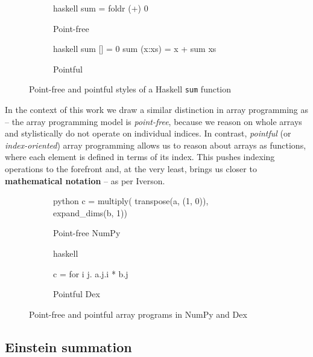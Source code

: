 \begin{figure}[h]
\centering
\begin{subfigure}{.3\textwidth}
  \centering
    \begin{cminted}{haskell}
sum = foldr (+) 0
    \end{cminted}
      \caption{Point-free}
\end{subfigure}%
\begin{subfigure}{.3\textwidth}
  \centering
  \begin{cminted}{haskell}
sum [] = 0
sum (x:xs) = x + sum xs
  \end{cminted}
  \caption{Pointful}
\end{subfigure}
\caption{Point-free and pointful styles of a Haskell \texttt{sum} function}
\label{fig:point-haskell}
\end{figure}

In the context of this work we draw a similar distinction in array programming as \textcite{paszke2021getting} -- the array programming model is \textit{point-free}, because we reason on whole arrays and stylistically do not operate on individual indices. In contrast, \textit{pointful} (or \textit{index-oriented}) array programming allows us to reason about arrays as functions, where each element is defined in terms of its index. This pushes indexing operations to the forefront and, at the very least, brings us closer to \textbf{mathematical 
notation} -- as per Iverson.

\begin{figure}[h]
\centering
\begin{subfigure}{.4\textwidth}
  \centering
    \begin{cminted}{python}
c = multiply(
  transpose(a, (1, 0)),
  expand_dims(b, 1))
    \end{cminted}
      \caption{Point-free NumPy}
\end{subfigure}%
\begin{subfigure}{.4\textwidth}
  \centering
  \begin{cminted}{haskell}

c = for i j. a.j.i * b.j
  
  \end{cminted}
  \caption{Pointful Dex}
\end{subfigure}
\caption{Point-free and pointful array programs in NumPy and Dex}
\label{fig:point-arrays}
\end{figure}


\subsection{Einstein summation}

